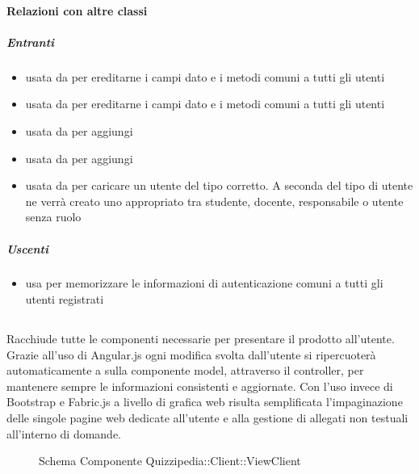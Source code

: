 \paragraph{Relazioni con altre classi}
\subparagraph{Entranti}
\begin{itemize}
\item usata da  per ereditarne i campi dato e i metodi comuni a tutti gli utenti
\item usata da  per ereditarne i campi dato e i metodi comuni a tutti gli utenti
\item usata da  per aggiungi
\item usata da  per aggiungi
\item usata da  per caricare un utente del tipo corretto. A seconda del tipo di utente ne verrà creato uno appropriato tra studente, docente, responsabile o utente senza ruolo
\end{itemize}
\subparagraph{Uscenti}
\begin{itemize}
\item usa  per memorizzare le informazioni di autenticazione comuni a tutti gli utenti registrati
\end{itemize}
\subsection{}
Racchiude tutte le componenti necessarie per presentare il prodotto all'utente.
Grazie all'uso di Angular.js ogni modifica svolta dall'utente si ripercuoterà automaticamente a sulla componente model, attraverso il controller, per mantenere sempre le informazioni consistenti e aggiornate.
Con l'uso invece di Bootstrap e Fabric.js a livello di grafica web risulta semplificata l'impaginazione delle singole pagine web dedicate all'utente e alla gestione di allegati non testuali all'interno di domande.
\begin{figure}[H]
\centering
\noindent{}
\caption[Schema Componente Quizzipedia::Client::ViewClient]{Schema Componente Quizzipedia::Client::ViewClient}
\end{figure}
